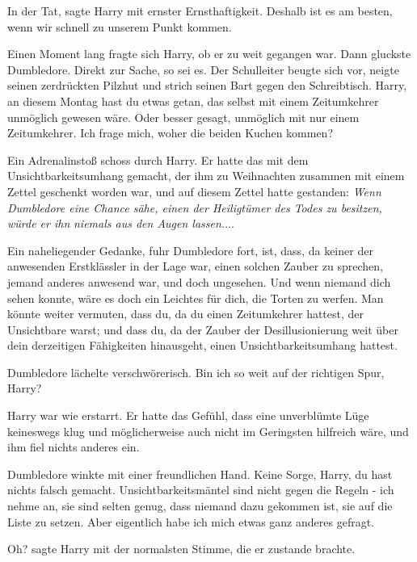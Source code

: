 \glqq In der Tat\grqq{}, sagte Harry mit ernster Ernsthaftigkeit. \glqq Deshalb
ist es am besten, wenn wir schnell zu unserem Punkt kommen.\grqq{}

Einen Moment lang fragte sich Harry, ob er zu weit gegangen war. Dann gluckste
Dumbledore. \glqq Direkt zur Sache, so sei es.\grqq{} Der Schulleiter beugte
sich vor, neigte seinen zerdrückten Pilzhut und strich seinen Bart gegen den
Schreibtisch. \glqq Harry, an diesem Montag hast du etwas getan, das selbst mit
einem Zeitumkehrer unmöglich gewesen wäre. Oder besser gesagt, unmöglich mit nur
einem Zeitumkehrer. Ich frage mich, woher die beiden Kuchen kommen?\grqq{}

Ein Adrenalinstoß schoss durch Harry. Er hatte das mit dem Unsichtbarkeitsumhang
gemacht, der ihm zu Weihnachten zusammen mit einem Zettel geschenkt worden war,
und auf diesem Zettel hatte gestanden: \emph{Wenn Dumbledore eine Chance sähe,
einen der Heiligtümer des Todes zu besitzen, würde er ihn }\emph{niemals aus den
Augen lassen.}...

\glqq Ein naheliegender Gedanke\grqq{}, fuhr Dumbledore fort, \glqq ist, dass,
da keiner der anwesenden Erstklässler in der Lage war, einen solchen Zauber zu
sprechen, jemand anderes anwesend war, und doch ungesehen. Und wenn niemand dich
sehen konnte, wäre es doch ein Leichtes für dich, die Torten zu werfen. Man
könnte weiter vermuten, dass du, da du einen Zeitumkehrer hattest, der
Unsichtbare warst; und dass du, da der Zauber der Desillusionierung weit über
dein derzeitigen Fähigkeiten hinausgeht, einen Unsichtbarkeitsumhang
hattest.\grqq{}

Dumbledore lächelte verschwörerisch. \glqq Bin ich so weit auf der richtigen
Spur, Harry?\grqq{}

Harry war wie erstarrt. Er hatte das Gefühl, dass eine unverblümte Lüge
keineswegs klug und möglicherweise auch nicht im Geringsten hilfreich wäre, und
ihm fiel nichts anderes ein.

Dumbledore winkte mit einer freundlichen Hand. \glqq Keine Sorge, Harry, du hast
nichts falsch gemacht. Unsichtbarkeitsmäntel sind nicht gegen die Regeln - ich
nehme an, sie sind selten genug, dass niemand dazu gekommen ist, sie auf die
Liste zu setzen. Aber eigentlich habe ich mich etwas ganz anderes
gefragt.\grqq{}

\glqq Oh?\grqq{} sagte Harry mit der normalsten Stimme, die er zustande brachte.

